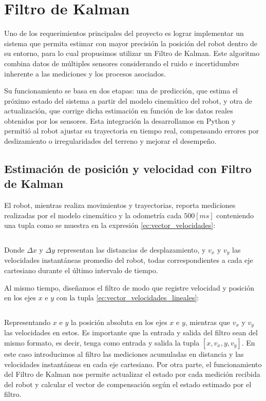 \section{Filtro de Kalman}

Uno de los requerimientos principales del proyecto es lograr implementar un sistema que permita estimar con mayor precisión la posición del robot dentro de su entorno, para lo cual propusimos utilizar un Filtro de Kalman. Este algoritmo combina datos de múltiples sensores considerando el ruido e incertidumbre inherente a las mediciones y los procesos asociados. \cite{negenborn2003robot}

Su funcionamiento se basa en dos etapas: una de predicción, que estima el próximo estado del sistema a partir del modelo cinemático del robot, y otra de actualización, que corrige dicha estimación en función de los datos reales obtenidos por los sensores. Esta integración la desarrollamos en Python y permitió al robot ajustar su trayectoria en tiempo real, compensando errores por deslizamiento o irregularidades del terreno y mejorar el desempeño.

\subsection{Estimación de posición y velocidad con Filtro de Kalman}
El robot, mientras realiza movimientos y trayectorias, reporta mediciones realizadas por el modelo cinemático y la odometría cada $500[ms]$ conteniendo una tupla como se muestra en la expresión \ref{ec:vector_velocidades}:

\begin{equation}
    [\Delta x, v_x, \Delta y, v_y] 
    \label{ec:vector_velocidades}
\end{equation}

Donde $\Delta x$ y $\Delta y$ representan las distancias de desplazamiento, y $v_x$ y $v_y$ las velocidades instantáneas promedio del robot, todas correspondientes a cada eje cartesiano durante el último intervalo de tiempo.

Al mismo tiempo, diseñamos el filtro de modo que registre velocidad y posición en los ejes $x$ e $y$ con la tupla \ref{ec:vector_velocidades_lineales}:

\begin{equation}
    [x, v_x, y, v_y]
    \label{ec:vector_velocidades_lineales}
\end{equation}

Representando $x$ e $y$ la posición absoluta en los ejes $x$ e $y$, mientras que $v_x$ y $v_y$ las velocidades en estos. Es importante que la entrada y salida del filtro sean del mismo formato, es decir, tenga como entrada y salida la tupla $[x, v_x, y, v_y]$. En este caso introducimos al filtro las mediciones acumuladas en distancia y las velocidades instantáneas en cada eje cartesiano. Por otra parte, el funcionamiento del Filtro de Kalman nos permite actualizar el estado por cada medición recibida del robot y calcular el vector de compensación según el estado estimado por el filtro.

